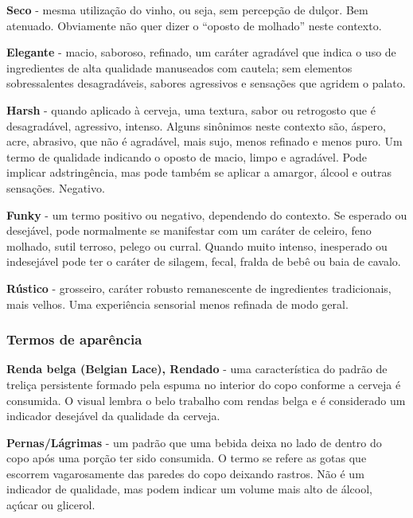 \textbf{Seco} - mesma utilização do vinho, ou seja, sem percepção de dulçor. Bem atenuado. Obviamente não quer dizer o “oposto de molhado” neste contexto.

\textbf{Elegante} - macio, saboroso, refinado, um caráter agradável que indica o uso de ingredientes de alta qualidade manuseados com cautela; sem elementos sobressalentes desagradáveis, sabores agressivos e sensações que agridem o palato.

\textbf{Harsh} - quando aplicado à cerveja, uma textura, sabor ou retrogosto que é desagradável, agressivo, intenso. Alguns sinônimos neste contexto são, áspero, acre, abrasivo, que não é agradável, mais sujo, menos refinado e menos puro. Um termo de qualidade indicando o oposto de macio, limpo e agradável. Pode implicar adstringência, mas pode também se aplicar a amargor, álcool e outras sensações. Negativo.

\textbf{Funky} - um termo positivo ou negativo, dependendo do contexto. Se esperado ou desejável, pode normalmente se manifestar com um caráter de celeiro, feno molhado, sutil terroso, pelego ou curral. Quando muito intenso, inesperado ou indesejável pode ter o caráter de silagem, fecal, fralda de bebê ou baia de cavalo.

\textbf{Rústico} - grosseiro, caráter robusto remanescente de ingredientes tradicionais, mais velhos. Uma experiência sensorial menos refinada de modo geral.
\subsubsection*{Termos de aparência}
\textbf{Renda belga (Belgian Lace), Rendado} - uma característica do padrão de treliça persistente formado pela espuma no interior do copo conforme a cerveja é consumida. O visual lembra o belo trabalho com rendas belga e é considerado um indicador desejável da qualidade da cerveja.

\textbf{Pernas/Lágrimas} - um padrão que uma bebida deixa no lado de dentro do copo após uma porção ter sido consumida. O termo se refere as gotas que escorrem vagarosamente das paredes do copo deixando rastros. Não é um indicador de qualidade, mas podem indicar um volume mais alto de álcool, açúcar ou glicerol.
